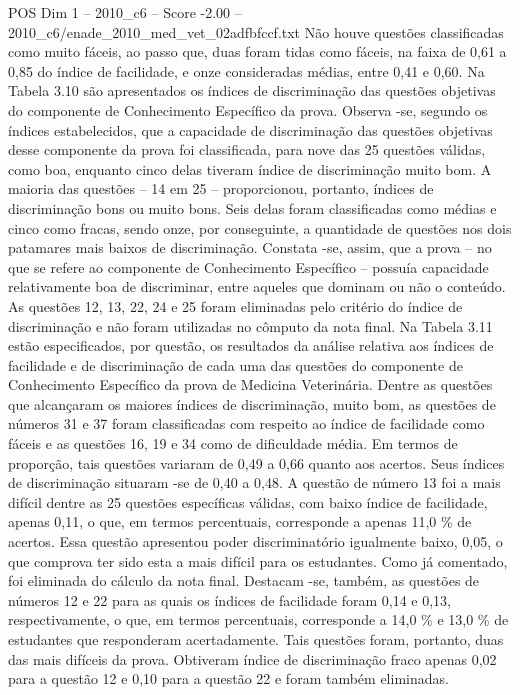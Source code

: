 \begin{textsample}{POS Dim 1 – 2010\_c6 – Score -2.00 – 2010\_c6/enade\_2010\_med\_vet\_02adfbfccf.txt}
Não houve questões classificadas como muito fáceis, ao passo que, duas foram tidas como fáceis, na faixa de 0,61 a 0,85 do índice de facilidade, e onze consideradas médias, entre 0,41 e 0,60.
Na Tabela 3.10 são apresentados os índices de discriminação das questões objetivas do componente de Conhecimento Específico da prova.
Observa -se, segundo os índices estabelecidos, que a capacidade de discriminação das questões objetivas desse componente da prova foi classificada, para nove das 25 questões válidas, como boa, enquanto cinco delas tiveram índice de discriminação muito bom.
A maioria das questões – 14 em 25 – proporcionou, portanto, índices de discriminação bons ou muito bons.
Seis delas foram classificadas como médias e cinco como fracas, sendo onze, por conseguinte, a quantidade de questões nos dois patamares mais baixos de discriminação.
Constata -se, assim, que a prova – no que se refere ao componente de Conhecimento Específico – possuía capacidade relativamente boa de discriminar, entre aqueles que dominam ou não o conteúdo.
As questões 12, 13, 22, 24 e 25 foram eliminadas pelo critério do índice de discriminação e não foram utilizadas no cômputo da nota final.
Na Tabela 3.11 estão especificados, por questão, os resultados da análise relativa aos índices de facilidade e de discriminação de cada uma das questões do componente de Conhecimento Específico da prova de Medicina Veterinária.
Dentre as questões que alcançaram os maiores índices de discriminação, muito bom, as questões de números 31 e 37 foram classificadas com respeito ao índice de facilidade como fáceis e as questões 16, 19 e 34 como de dificuldade média.
Em termos de proporção, tais questões variaram de 0,49 a 0,66 quanto aos acertos.
Seus índices de discriminação situaram -se de 0,40 a 0,48.
A questão de número 13 foi a mais difícil dentre as 25 questões específicas válidas, com baixo índice de facilidade, apenas 0,11, o que, em termos percentuais, corresponde a apenas 11,0 \% de acertos.
Essa questão apresentou poder discriminatório igualmente baixo, 0,05, o que comprova ter sido esta a mais difícil para os estudantes.
Como já comentado, foi eliminada do cálculo da nota final.
Destacam -se, também, as questões de números 12 e 22 para as quais os índices de facilidade foram 0,14 e 0,13, respectivamente, o que, em termos percentuais, corresponde a 14,0 \% e 13,0 \% de estudantes que responderam acertadamente.
Tais questões foram, portanto, duas das mais difíceis da prova.
Obtiveram índice de discriminação fraco apenas 0,02 para a questão 12 e 0,10 para a questão 22 e foram também eliminadas.

\end{textsample}
